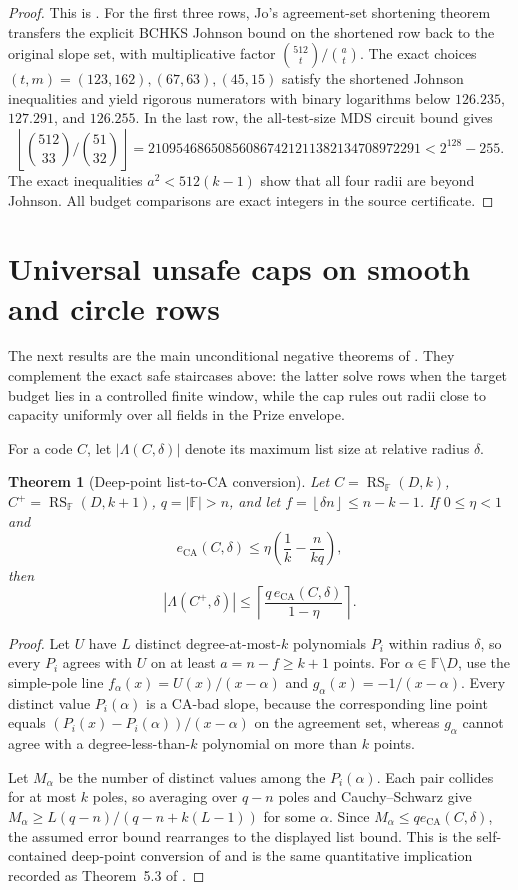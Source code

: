 \documentclass[11pt,a4paper]{amsart}
\numberwithin{equation}{section}
\newtheorem{theorem}{Theorem}[section]
\theoremstyle{remark}
\DeclareMathOperator{\RS}{RS}
\DeclareMathOperator{\CA}{CA}
\newcommand{\F}{\mathbb F}
\newcommand{\floor}[1]{\left\lfloor#1\right\rfloor}
\newcommand{\ceil}[1]{\left\lceil#1\right\rceil}
\begin{document}
\begin{proof}
This is \cite[Proposition ``Four finite rows beyond Johnson'']{ChoShort26}.  For the first three rows, Jo's agreement-set shortening theorem \cite{Jo26} transfers the explicit BCHKS Johnson bound on the shortened row back to the original slope set, with multiplicative factor $\binom{512}{t}/\binom at$.  The exact choices $(t,m)=(123,162),(67,63),(45,15)$ satisfy the shortened Johnson inequalities and yield rigorous numerators with binary logarithms below $126.235$, $127.291$, and $126.255$.  In the last row, the all-test-size MDS circuit bound gives
\[
 \floor{\binom{512}{33}/\binom{51}{32}}
 =210954686508560867421211382134708972291<2^{128}-255.
\]
The exact inequalities $a^2<512(k-1)$ show that all four radii are beyond Johnson.  All budget comparisons are exact integers in the source certificate.
\end{proof}


\section{Universal unsafe caps on smooth and circle rows}

The next results are the main unconditional negative theorems of \cite{ChoCap26}.  They complement the exact safe staircases above: the latter solve rows when the target budget lies in a controlled finite window, while the cap rules out radii close to capacity uniformly over all fields in the Prize envelope.

For a code $C$, let $|\Lambda(C,\delta)|$ denote its maximum list size at relative radius $\delta$.

\begin{theorem}[Deep-point list-to-CA conversion]\label{thm:list-ca}
Let $C=\RS_{\F}(D,k)$, $C^+=\RS_{\F}(D,k+1)$, $q=|\F|>n$, and let $f=\floor{\delta n}\le n-k-1$.  If $0\le\eta<1$ and
\[
 e_{\CA}(C,\delta)\le \eta\left(\frac1k-\frac{n}{kq}\right),
\]
then
\[
 |\Lambda(C^+,\delta)|\le
 \ceil{\frac{q\,e_{\CA}(C,\delta)}{1-\eta}}.
\]
\end{theorem}

\begin{proof}
Let $U$ have $L$ distinct degree-at-most-$k$ polynomials $P_i$ within radius $\delta$, so every $P_i$ agrees with $U$ on at least $a=n-f\ge k+1$ points.  For $\alpha\in\F\setminus D$, use the simple-pole line $f_\alpha(x)=U(x)/(x-\alpha)$ and $g_\alpha(x)=-1/(x-\alpha)$.  Every distinct value $P_i(\alpha)$ is a CA-bad slope, because the corresponding line point equals $(P_i(x)-P_i(\alpha))/(x-\alpha)$ on the agreement set, whereas $g_\alpha$ cannot agree with a degree-less-than-$k$ polynomial on more than $k$ points.

Let $M_\alpha$ be the number of distinct values among the $P_i(\alpha)$.  Each pair collides for at most $k$ poles, so averaging over $q-n$ poles and Cauchy--Schwarz give
$M_\alpha\ge L(q-n)/(q-n+k(L-1))$ for some $\alpha$.  Since $M_\alpha\le q e_{\CA}(C,\delta)$, the assumed error bound rearranges to the displayed list bound.  This is the self-contained deep-point conversion of \cite{ChoCap26} and is the same quantitative implication recorded as Theorem~5.3 of \cite{ABF26}.
\end{proof}
\end{document}
